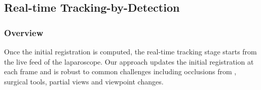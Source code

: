 
\subsection{Real-time Tracking-by-Detection}
\label{sec:updateRegistration}
\subsubsection{Overview}
Once the initial registration is computed, the real-time tracking stage starts from the live feed of the laparoscope. 
Our approach updates the initial registration at each frame and is robust to common challenges including occlusions from \eg, surgical tools, partial views and viewpoint changes.


